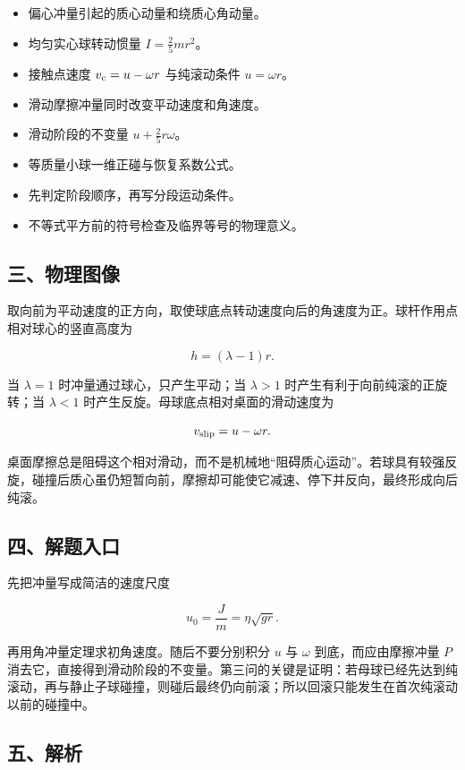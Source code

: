 \documentclass[12pt,a4paper,UTF8]{ctexart}
\newcommand{\tightlist}{\setlength{\itemsep}{0pt}\setlength{\parskip}{0pt}}
\begin{document}
\begin{itemize}
\tightlist
\item
  偏心冲量引起的质心动量和绕质心角动量。
\item
  均匀实心球转动惯量 \(I=\frac25mr^2\)。
\item
  接触点速度 \(v_{\rm c}=u-\omega r\) 与纯滚动条件 \(u=\omega r\)。
\item
  滑动摩擦冲量同时改变平动速度和角速度。
\item
  滑动阶段的不变量 \(u+\frac25r\omega\)。
\item
  等质量小球一维正碰与恢复系数公式。
\item
  先判定阶段顺序，再写分段运动条件。
\item
  不等式平方前的符号检查及临界等号的物理意义。
\end{itemize}

\subsection{三、物理图像}\label{ux4e09ux7269ux7406ux56feux50cf}

取向前为平动速度的正方向，取使球底点转动速度向后的角速度为正。球杆作用点相对球心的竖直高度为

\[h=(\lambda-1)r.\]

当 \(\lambda=1\) 时冲量通过球心，只产生平动；当 \(\lambda>1\)
时产生有利于向前纯滚的正旋转；当 \(\lambda<1\)
时产生反旋。母球底点相对桌面的滑动速度为

\[v_{\rm slip}=u-\omega r.\]

桌面摩擦总是阻碍这个相对滑动，而不是机械地``阻碍质心运动''。若球具有较强反旋，碰撞后质心虽仍短暂向前，摩擦却可能使它减速、停下并反向，最终形成向后纯滚。

\subsection{四、解题入口}\label{ux56dbux89e3ux9898ux5165ux53e3}

先把冲量写成简洁的速度尺度

\[u_0=\frac Jm=\eta\sqrt{gr}.\]

再用角冲量定理求初角速度。随后不要分别积分 \(u\) 与 \(\omega\)
到底，而应由摩擦冲量 \(P\)
消去它，直接得到滑动阶段的不变量。第三问的关键是证明：若母球已经先达到纯滚动，再与静止子球碰撞，则碰后最终仍向前滚；所以回滚只能发生在首次纯滚动以前的碰撞中。

\subsection{五、解析}\label{ux4e94ux89e3ux6790}
\end{document}
